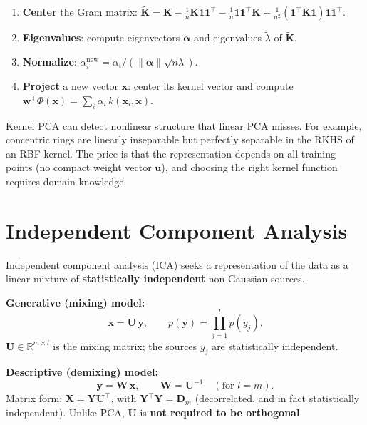 \documentclass[11pt, oneside]{book}
\newcommand{\R}{\mathbb{R}}
\newcommand{\T}{^{\top}}
\begin{document}
\begin{thmbox}[title={Kernel PCA Algorithm}]
\begin{enumerate}
  \item \textbf{Center} the Gram matrix:
        $\tilde{\bm{K}} = \bm{K} - \frac{1}{n}\bm{K}\bm{1}\bm{1}\T - \frac{1}{n}\bm{1}\bm{1}\T\bm{K} + \frac{1}{n^2}(\bm{1}\T\bm{K}\bm{1})\bm{1}\bm{1}\T$.
  \item \textbf{Eigenvalues}: compute eigenvectors $\bm{\alpha}$ and eigenvalues
        $\tilde\lambda$ of $\tilde{\bm{K}}$.
  \item \textbf{Normalize}: $\alpha_i^{\mathrm{new}} = \alpha_i/(\|\bm{\alpha}\|\sqrt{n\lambda})$.
  \item \textbf{Project} a new vector $\bm{x}$: center its kernel vector and compute
        $\bm{w}\T\Phi(\bm{x}) = \sum_i \alpha_i\,k(\bm{x}_i,\bm{x})$.
\end{enumerate}
\end{thmbox}

\begin{intbox}
  Kernel PCA can detect nonlinear structure that linear PCA misses.
  For example, concentric rings are linearly inseparable but perfectly separable in
  the RKHS of an RBF kernel.
  The price is that the representation depends on all training points (no compact weight
  vector $\bm{u}$), and choosing the right kernel function requires domain knowledge.
\end{intbox}


\chapter{Independent Component Analysis}

Independent component analysis (ICA) seeks a representation of the data as a linear
mixture of \textbf{statistically independent} non-Gaussian sources.

\begin{defbox}[title={ICA Model}]
\textbf{Generative (mixing) model:}
\[
  \bm{x} = \bm{U}\,\bm{y}, \qquad p(\bm{y}) = \prod_{j=1}^l p(y_j).
\]
$\bm{U} \in \R^{m \times l}$ is the mixing matrix; the sources $y_j$ are statistically
independent.

\textbf{Descriptive (demixing) model:}
\[
  \bm{y} = \bm{W}\,\bm{x}, \qquad \bm{W} = \bm{U}^{-1}
  \quad (\text{for } l = m).
\]
Matrix form: $\bm{X} = \bm{Y}\bm{U}\T$, with $\bm{Y}\T\bm{Y} = \bm{D}_m$ (decorrelated,
and in fact statistically independent).
Unlike PCA, $\bm{U}$ is \textbf{not required to be orthogonal}.
\end{defbox}
\end{document}
